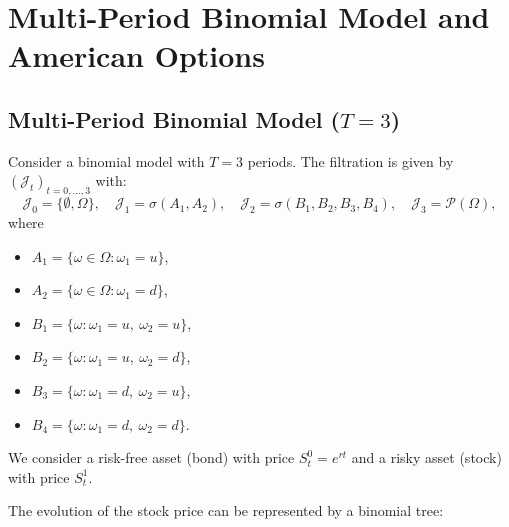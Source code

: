 \chapter{Multi-Period Binomial Model and American Options}

\section{Multi-Period Binomial Model ($T=3$)}

Consider a binomial model with $T=3$ periods.  
The filtration is given by $(\mathcal{J}_t)_{t=0,\dots,3}$ with:
\[
\mathcal{J}_0=\{\emptyset,\Omega\},\quad
\mathcal{J}_1=\sigma(A_1,A_2),\quad
\mathcal{J}_2=\sigma(B_1,B_2,B_3,B_4),\quad
\mathcal{J}_3=\mathcal{P}(\Omega),
\]
where
\begin{itemize}
    \item $A_1 = \{\omega \in \Omega : \omega_1 = u\}$,
    \item $A_2 = \{\omega \in \Omega : \omega_1 = d\}$,
    \item $B_1 = \{\omega : \omega_1 = u,\ \omega_2 = u\}$,
    \item $B_2 = \{\omega : \omega_1 = u,\ \omega_2 = d\}$,
    \item $B_3 = \{\omega : \omega_1 = d,\ \omega_2 = u\}$,
    \item $B_4 = \{\omega : \omega_1 = d,\ \omega_2 = d\}$.
\end{itemize}

We consider a risk-free asset (bond) with price $S_t^0 = e^{rt}$  
and a risky asset (stock) with price $S_t^1$.

The evolution of the stock price can be represented by a binomial tree:

